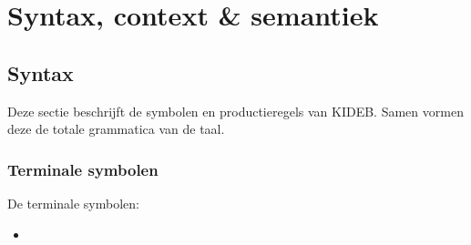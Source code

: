 \chapter{Syntax, context \& semantiek}
\section{Syntax}
Deze sectie beschrijft de symbolen en productieregels van KIDEB. Samen vormen deze de totale grammatica van de taal.
\subsection{Terminale symbolen}
De terminale symbolen:
\begin{itemize}
    \item \itab{}
\end{itemize}

